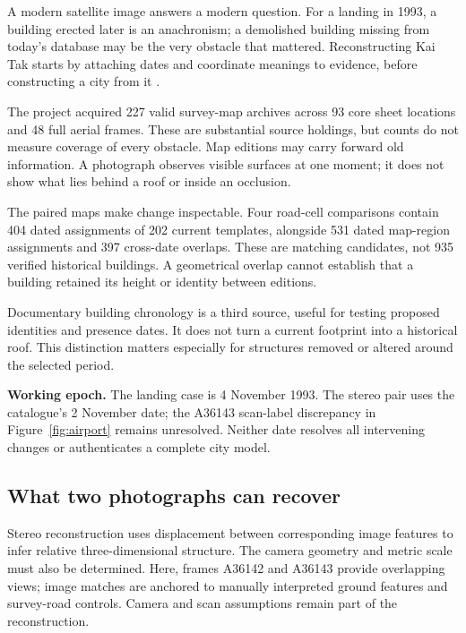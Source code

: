 \label{part:2}
A modern satellite image answers a modern question. For a landing in 1993, a building erected later is an anachronism; a demolished building missing from today's database may be the very obstacle that mattered. Reconstructing Kai Tak starts by attaching dates and coordinate meanings to evidence, before constructing a city from it \citep{maps,photos}.


The project acquired 227 valid survey-map archives across 93 core sheet locations and 48 full aerial frames. These are substantial source holdings, but counts do not measure coverage of every obstacle. Map editions may carry forward old information. A photograph observes visible surfaces at one moment; it does not show what lies behind a roof or inside an occlusion.

The paired maps make change inspectable. Four road-cell comparisons contain 404 dated assignments of 202 current templates, alongside 531 dated map-region assignments and 397 cross-date overlaps. These are matching candidates, not 935 verified historical buildings. A geometrical overlap cannot establish that a building retained its height or identity between editions.

Documentary building chronology is a third source, useful for testing proposed identities and presence dates. It does not turn a current footprint into a historical roof. This distinction matters especially for structures removed or altered around the selected period.

\textbf{Working epoch.} The landing case is 4 November 1993. The stereo pair uses the catalogue's 2 November date; the A36143 scan-label discrepancy in Figure~\ref{fig:airport} remains unresolved. Neither date resolves all intervening changes or authenticates a complete city model.
\par\medskip
\subsection*{What two photographs can recover}
Stereo reconstruction uses displacement between corresponding image features to infer relative three-dimensional structure. The camera geometry and metric scale must also be determined. Here, frames A36142 and A36143 provide overlapping views; image matches are anchored to manually interpreted ground features and survey-road controls. Camera and scan assumptions remain part of the reconstruction.

